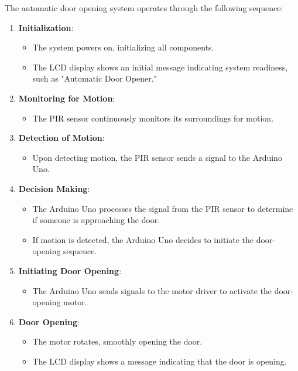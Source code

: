 \documentclass{article}
\begin{document}
The automatic door opening system operates through the following sequence:

\begin{enumerate}
    \item \textbf{Initialization}:
        \begin{itemize}
            \item The system powers on, initializing all components.
            \item The LCD display shows an initial message indicating system readiness, such as "Automatic Door Opener."
        \end{itemize}
        
    \item \textbf{Monitoring for Motion}:
        \begin{itemize}
            \item The PIR sensor continuously monitors its surroundings for motion.
        \end{itemize}
        
    \item \textbf{Detection of Motion}:
        \begin{itemize}
            \item Upon detecting motion, the PIR sensor sends a signal to the Arduino Uno.
        \end{itemize}
        
    \item \textbf{Decision Making}:
        \begin{itemize}
            \item The Arduino Uno processes the signal from the PIR sensor to determine if someone is approaching the door.
            \item If motion is detected, the Arduino Uno decides to initiate the door-opening sequence.
        \end{itemize}
        
    \item \textbf{Initiating Door Opening}:
        \begin{itemize}
            \item The Arduino Uno sends signals to the motor driver to activate the door-opening motor.
        \end{itemize}
        
    \item \textbf{Door Opening}:
        \begin{itemize}
            \item The motor rotates, smoothly opening the door.
            \item The LCD display shows a message indicating that the door is opening.
        \end{itemize}
        

\end{enumerate}
\end{document}
